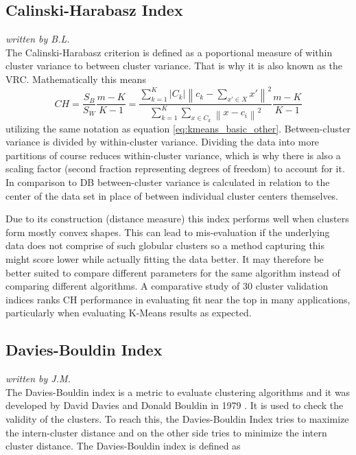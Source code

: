 \subsection{Calinski-Harabasz Index}
\textit{written by B.L.}\\

The Calinski-Harabasz criterion \cite{calinski1974dendrite} is defined as a poportional measure of within cluster variance to between cluster variance. That is why it is also known as the \gls{VRC}. Mathematically this means
\begin{equation}
        CH = \frac{S_{B}}{S_{W}}\frac{m-K}{K-1} = \frac{\sum_{k=1}^{K} \left | C_{k} \right | \left \| c_{k} - \sum_{x' \in X}^{} x' \right \|^{2}}{\sum_{k=1}^{K}\sum_{x \in C_{k}}^{} \left \| x - c_{i} \right \|^{2}} \frac{m-K}{K-1}
\end{equation}
utilizing the same notation as equation \ref{eq:kmeans_basic_other}. Between-cluster variance is divided by within-cluster variance. Dividing the data into more partitions of course reduces within-cluster variance, which is why there is also a scaling factor (second fraction representing degrees of freedom) to account for it. In comparison to \gls{DB} between-cluster variance is calculated in relation to the center of the data set in place of between individual cluster centers themselves. 

Due to its construction (distance measure) this index performs well when clusters form mostly convex shapes. This can lead to mis-evaluation if the underlying data does not comprise of such globular clusters so a method capturing this might score lower while actually fitting the data better. It may therefore be better suited to compare different parameters for the same algorithm instead of comparing different algorithms. A comparative study of 30 cluster validation indices \cite{arbelaitz2013extensive} ranks \gls{CH} performance in evaluating fit near the top in many applications, particularly when evaluating K-Means results as expected.
    
    
\subsection{Davies-Bouldin Index}
\textit{written by J.M.}\\

The Davies-Bouldin index is a metric to evaluate clustering algorithms and it was developed by David Davies and Donald Bouldin in 1979 \cite{davies1979cluster}. 
It is used to check the validity of the clusters. To reach this, the Davies-Bouldin Index tries to maximize the intern-cluster distance 
and on the other side tries to minimize the intern cluster distance. 
The Davies-Bouldin index is defined as 
	
